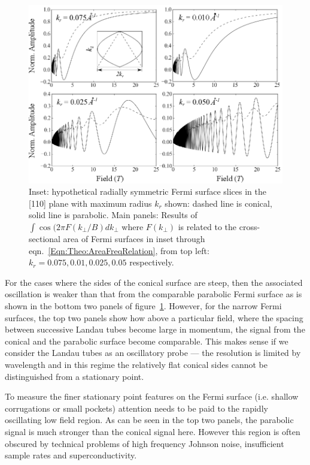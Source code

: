 \begin{figure}[htbp]
    \begin{center}
        \includegraphics[scale=1.0]{Chapter-Theory/Figures/ExtremalPhases/ExtremalPhases}
        \caption{Inset: hypothetical radially symmetric Fermi surface slices in the [110] plane with maximum radius $k_r$ shown: dashed line is conical, solid line is parabolic. Main panels: Results of $\int\cos{(2\pi F(k_{\perp}/B)} dk_{\perp}$ where $F(k_{\perp})$ is related to the cross-sectional area of Fermi surfaces in inset through eqn.~\ref{Eqn:Theo:AreaFreqRelation}, from top left: $k_r = 0.075, 0.01, 0.025, 0.05$ respectively.}
        \label{Fig:Theo:ExtremalPhases}
    \end{center}
\end{figure}
For the cases where the sides of the conical surface are steep, then the associated oscillation is weaker than that from the comparable parabolic Fermi surface as is shown in the bottom two panels of figure~\ref{Fig:Theo:ExtremalPhases}. However, for the narrow Fermi surfaces, the top two panels show how above a particular field, where the spacing between successive Landau tubes become large in momentum, the signal from the conical and the parabolic surface become comparable. This makes sense if we consider the Landau tubes as an oscillatory probe --- the resolution is limited by wavelength and in this regime the relatively flat conical sides cannot be distinguished from a stationary point.

To measure the finer stationary point features on the Fermi surface (i.e. shallow corrugations or small pockets) attention needs to be paid to the rapidly oscillating low field region. As can be seen in the top two panels, the parabolic signal is much stronger than the conical signal here. However this region is often obscured by technical problems of high frequency Johnson noise, insufficient sample rates and superconductivity.

